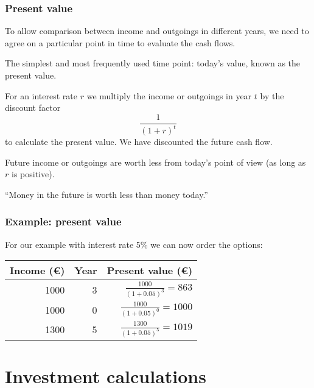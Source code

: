 \documentclass[10pt,aspectratio=169,dvipsnames]{beamer}
\newcommand{\ra}[1]{\renewcommand{\arraystretch}{#1}}
\begin{document}
\begin{frame}
  \frametitle{Present value}

  To allow comparison between income and outgoings in different years, we need to agree on a particular point in time to evaluate the cash flows.

  The simplest and most frequently used time point: today's value, known as the \alert{present value}.

  For an \alert{interest rate} $r$ we multiply the income or outgoings in year $t$ by the \alert{discount factor}
  \begin{equation*}
    \frac{1}{(1+r)^t}
  \end{equation*}
  to calculate the present value. We have \alert{discounted} the future cash flow.

  Future income or outgoings are \alert{worth less} from today's point of view (as long as $r$ is positive).

  ``Money in the future is worth less than money today.''

\end{frame}

\begin{frame}
  \frametitle{Example: present value}

  For our example with interest rate 5\% we can now order the options:
  \ra{1.1}
  \begin{table}[!t]
    \begin{tabular}{rrr}
      \toprule
      Income (\euro) & Year & Present value (\euro)  \\
      \midrule
      1000  &  3 & $\frac{1000}{(1+0.05)^3} = 863$  \\
      1000  &  0 & $\frac{1000}{(1+0.05)^0} = 1000$ \\
      1300  &  5 & $\frac{1300}{(1+0.05)^5} = 1019$ \\
      \bottomrule
    \end{tabular}
  \end{table}

\end{frame}



\section{Investment calculations}
\end{document}
